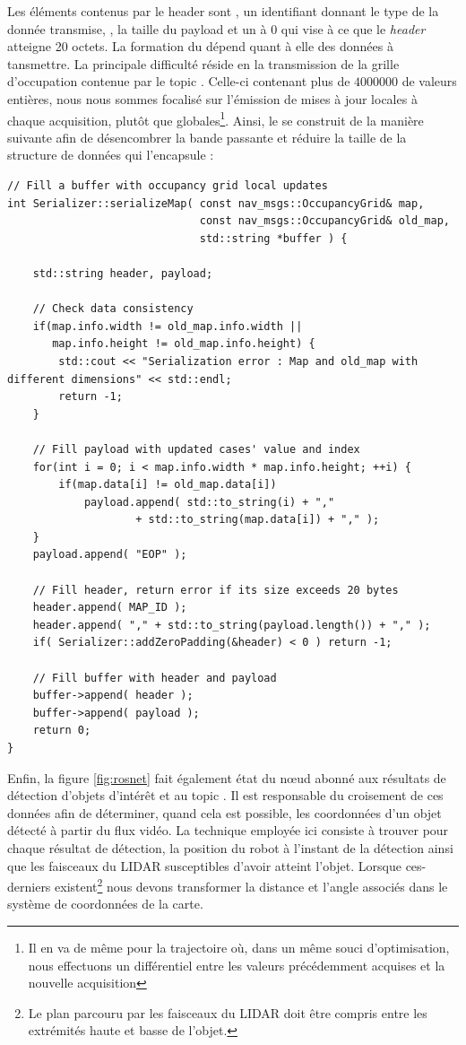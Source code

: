 Les éléments contenus par le header sont , un identifiant donnant le type de la donnée transmise, , la taille du payload et un  à $0$ qui vise à ce que le \emph{header} atteigne 20 octets. 
La formation du  dépend quant à elle des données à tansmettre. 
La principale difficulté réside en la transmission de la grille d'occupation contenue par le topic . 
Celle-ci contenant plus de $4 000 000$ de valeurs entières, nous nous sommes focalisé sur l'émission de mises à jour locales à chaque acquisition, plutôt que globales\footnote{Il en va de même pour la trajectoire où,
dans un même souci d'optimisation, nous effectuons un différentiel entre les valeurs précédemment acquises et la nouvelle acquisition}. 
Ainsi, le  se construit de la manière suivante afin de désencombrer la bande passante et réduire la taille de la structure de données qui l'encapsule :

\begin{lstlisting}[style = customcpp]
// Fill a buffer with occupancy grid local updates
int Serializer::serializeMap( const nav_msgs::OccupancyGrid& map, 
							  const nav_msgs::OccupancyGrid& old_map, 
							  std::string *buffer ) {
	
	std::string header, payload; 
	
	// Check data consistency  
	if(map.info.width != old_map.info.width || 
	   map.info.height != old_map.info.height) {
		std::cout << "Serialization error : Map and old_map with different dimensions" << std::endl; 
		return -1; 
	}	
	
	// Fill payload with updated cases' value and index
	for(int i = 0; i < map.info.width * map.info.height; ++i) {
		if(map.data[i] != old_map.data[i])	
		    payload.append( std::to_string(i) + ","
				    + std::to_string(map.data[i]) + "," );	
	}	
	payload.append( "EOP" );
	
	// Fill header, return error if its size exceeds 20 bytes
	header.append( MAP_ID );
	header.append( "," + std::to_string(payload.length()) + "," );
	if( Serializer::addZeroPadding(&header) < 0 ) return -1; 
	
	// Fill buffer with header and payload 
	buffer->append( header );
	buffer->append( payload );	
	return 0; 
}
\end{lstlisting}

Enfin, la figure \ref{fig:rosnet} fait également état du n\oe{}ud  abonné aux résultats de détection d'objets d'intérêt et au topic .
Il est responsable du croisement de ces données afin de déterminer, quand cela est possible, les coordonnées d'un objet détecté à partir du flux vidéo.  
La technique employée ici consiste à trouver pour chaque résultat de détection, la position du robot à l'instant de la détection ainsi que les faisceaux du LIDAR susceptibles d'avoir atteint l'objet. 
Lorsque ces-derniers existent\footnote{Le plan parcouru par les faisceaux du LIDAR doit être compris entre les extrémités haute et basse de l'objet.} 
nous devons transformer la distance et l'angle associés dans le système de coordonnées de la carte. 

